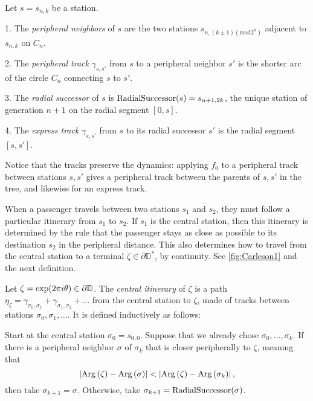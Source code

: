 \begin{definition}
Let $s=s_{n,k}$ be a station.

1. The \emph{peripheral neighbors} of $s$ are the two stations $s_{n,\left(k\pm1\right) (\mathrm{mod} 2^{n})}$ adjacent to $s_{n,k}$ on $C_{n}$.

2. The \emph{peripheral track }$\gamma_{s,s'}$ from $s$ to a peripheral neighbor $s'$
is the shorter arc of the circle $C_{n}$ connecting $s$ to $s'$.

3. The \emph{radial successor} of $s$ is $\operatorname{RadialSuccessor}(s)=s_{n+1,2k}$, the unique station of generation $n+1$ on the radial segment $[0,s]$.

4. The \emph{express track} $\gamma_{s,s'}$ from $s$ to its radial successor $s'$ is the radial segment $[s,s']$.

\end{definition}

Notice that the tracks preserve the dynamics: applying $f_0$ to a peripheral track between stations $s,s'$ gives a peripheral track between the parents of $s,s'$ in the tree, and likewise for an express track.

When a passenger travels between two stations $s_1$ and $s_2$, they must follow a particular itinerary from $s_1$ to $s_2$.
If $s_1$ is the central station, then this itinerary is determined by the rule that the passenger stays as close as possible to its destination $s_2$ in the peripheral distance. 
This also determines how to travel from the central station to a terminal $\zeta\in \partial \mathbb D^*$, by continuity. See \cref{fig:Carleson1} and the next definition.


\begin{definition}
Let $\zeta=\exp(2\pi i\theta)\in\partial\mathbb{D}$. The \emph{central itinerary} of $\zeta$ is a path $\eta_\zeta = \gamma _{\sigma_0,\sigma_1} + \gamma_{\sigma_1,\sigma_2}+\ldots$ from the central station to $\zeta$, made of tracks between stations $\sigma_0,\sigma_1,\ldots$. It is defined inductively as follows:

Start at the central station $\sigma_0=s_{0,0}$. Suppose that we already chose $\sigma_0,\ldots,\sigma_k$. If there is a peripheral neighbor $\sigma$ of $\sigma_k$ that is closer peripherally to $\zeta$, meaning that $$\left|\operatorname{Arg}\left(\zeta\right)-\operatorname{Arg}\left(\sigma\right)\right|
< \left|\operatorname{Arg}\left(\zeta\right)-\operatorname{Arg}\left(\sigma_{k}\right)\right|,$$ then take $\sigma_{k+1}=\sigma$. Otherwise, take 
$\sigma_{k+1}=\operatorname{RadialSuccessor}(\sigma)$.
\end{definition}

